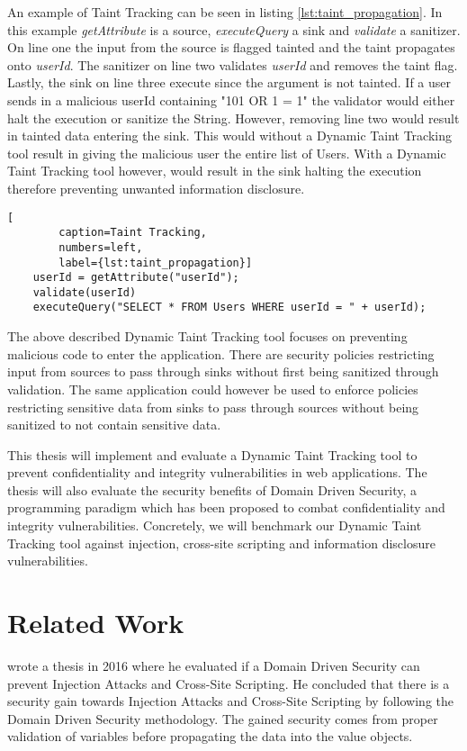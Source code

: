 \documentclass{../kththesis}
\begin{document}
	An example of Taint Tracking can be seen in listing \ref{lst:taint_propagation}. In this example \textit{getAttribute} is a source, \textit{executeQuery} a sink and \textit{validate} a sanitizer. On line one the input from the source is flagged tainted and the taint propagates onto \textit{userId}. The sanitizer on line two validates \textit{userId} and removes the taint flag. Lastly, the sink on line three execute since the argument is not tainted. If a user sends in a malicious userId containing "101 OR 1 = 1" the validator would either halt the execution or sanitize the String. However, removing line two would result in tainted data entering the sink. This would without a Dynamic Taint Tracking tool result in giving the malicious user the entire list of Users. With a Dynamic Taint Tracking tool however, would result in the sink halting the execution therefore preventing unwanted information disclosure.
	
	\begin{lstlisting}[
		caption=Taint Tracking,
		numbers=left,
		label={lst:taint_propagation}]
	userId = getAttribute("userId");
	validate(userId)
	executeQuery("SELECT * FROM Users WHERE userId = " + userId);
	\end{lstlisting}
	
	The above described Dynamic Taint Tracking tool focuses on preventing malicious code to enter the application. There are security policies restricting input from sources to pass through sinks without first being sanitized through validation. The same application could however be used to enforce policies restricting sensitive data from sinks to pass through sources without being sanitized to not contain sensitive data. 
	
	This thesis will implement and evaluate a Dynamic Taint Tracking tool to prevent confidentiality and integrity vulnerabilities in web applications. The thesis will also evaluate the security benefits of Domain Driven Security, a programming paradigm which has been proposed to combat confidentiality and integrity vulnerabilities. Concretely, we will benchmark our Dynamic Taint Tracking tool against injection, cross-site scripting and information disclosure vulnerabilities.
	
	
	\section{Related Work}
	\textcite{Stendahl2016} wrote a thesis in 2016 where he evaluated if a Domain Driven Security can prevent Injection Attacks and Cross-Site Scripting. He concluded that there is a security gain towards Injection Attacks and Cross-Site Scripting by following the Domain Driven Security methodology. The gained security comes from proper validation of variables before propagating the data into the value objects.
	
\end{document}
